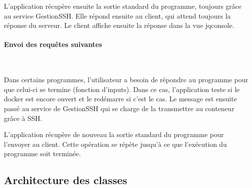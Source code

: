 \par L'application récupère ensuite la sortie standard du programme, toujours grâce au service GestionSSH. Elle répond ensuite au client, qui attend toujours la réponse du serveur. Le client affiche ensuite la réponse dans la vue jqconsole.

\paragraph*{Envoi des requêtes suivantes} \

\par Dans certains programmes, l'utilisateur a besoin de répondre au programme pour que celui-ci se termine (fonction d'inputs). Dans ce cas, l'application teste si le docker est encore ouvert et le redémarre si c'est le cas. Le message est ensuite passé au service de GestionSSH qui se charge de la transmettre au conteneur grâce à SSH.

\par L'application récupère de nouveau la sortie standard du programme pour l'envoyer au client. Cette opération se répète jusqu'à ce que l'exécution du programme soit terminée.

\subsection{Architecture des classes}